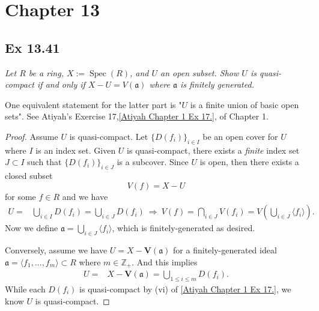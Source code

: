 \section{Chapter 13}

\subsection{Ex 13.41}\label{Altman Ex 13.41} \textit{Let $R$ be a ring, $X := \operatorname{Spec}(R)$, and $U$ an open subset. Show $U$ is quasi-compact if and only if $X-U = V(\mathfrak a)$ where $\mathfrak a$ is finitely generated.}
    
One equivalent statement for the latter part is "$U$ is a finite union of basic open sets". See Atiyah's Exercise 17,\ref{Atiyah Chapter 1 Ex 17.}, of Chapter 1. 
\begin{proof}
Assume $U$ is quasi-compact. Let $\{D(f_i)\}_{i\in I}$ be an open cover for $U$ where $I$ is an index set. Given $U$ is quasi-compact, there exists a \textit{finite} index set $J\subset I$ such that $\{D(f_i)\}_{i\in J}$ is a subcover. Since $U$ is open, then there exists a closed subset 
$$V(f)=X-U$$ for some $f\in R$ and we have 
\begin{align*}
    U =& \bigcup_{i\in I} D(f_i) = \bigcup_{i\in J} D(f_i)
    ~\Rightarrow~ V(f) = \bigcap_{i\in J}V(f_i) = V\left(\bigcup_{i\in J} \langle f_i\rangle\right).
\end{align*}
Now we define $\mathfrak a=\bigcup_{i\in J} \langle f_i\rangle$, which is finitely-generated as desired.

Conversely, assume we have $U=X-\mathbf V(\mathfrak a)$ for a finitely-generated ideal $\mathfrak a=\langle f_1,...,f_m\rangle\subset R$ where $m\in\mathbb Z_+$. And this implies 
\begin{align*}
    U =& X-\mathbf V(\mathfrak a) = \bigcup_{1\leq i\leq m}D(f_i).
\end{align*}While each $D(f_i)$ is quasi-compact by (vi) of \ref{Atiyah Chapter 1 Ex 17.}, we know $U$ is quasi-compact. 
\end{proof}